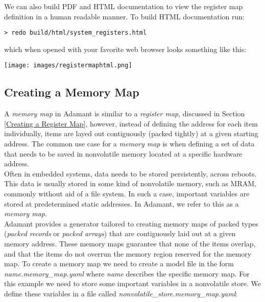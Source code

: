 We can also build PDF and HTML documentation to view the register map definition in a human readable manner. To build HTML documentation run:

\vspace{5mm} %
\begin{verbatim}
> redo build/html/system_registers.html
\end{verbatim}
\vspace{5mm} %

which when opened with your favorite web browser looks something like this:

\vspace{5mm} %
\texttt{[image: images/registermaphtml.png]}
\vspace{5mm} %

\subsection{Creating a Memory Map} \label{Creating a Memory Map}

A \textit{memory map} in Adamant is similar to a \textit{register map}, discussed in Section \ref{Creating a Register Map}, however, instead of defining the address for each item individually, items are layed out contiguously (packed tightly) at a given starting address. The common use case for a \textit{memory map} is when defining a set of data that needs to be saved in nonvolatile memory located at a specific hardware address. \\

Often in embedded systems, data needs to be stored persistently, across reboots. This data is usually stored in some kind of nonvolatile memory, such as MRAM, commonly without aid of a file system. In such a case, important variables are stored at predetermined static addresses. In Adamant, we refer to this as a \textit{memory map}. \\

Adamant provides a generator tailored to creating memory maps of packed types (\textit{packed records} or \textit{packed arrays}) that are contiguously laid out at a given memory address. These memory maps guarantee that none of the items overlap, and that the items do not overrun the memory region reserved for the memory map. To create a memory map we need to create a model file in the form \textit{name.memory\_map.yaml} where \textit{name} describes the specific memory map. For this example we need to store some important variables in a nonvolatile store. We define these variables in a file called \textit{nonvolatile\_store.memory\_map.yaml}: \\

